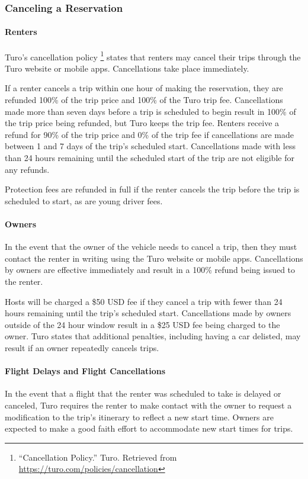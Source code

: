 \documentclass[review,12pt]{elsarticle}
\begin{document}
  \subsubsection{Canceling a Reservation}
    \paragraph{Renters}
    Turo's cancellation policy
    \footnote{``Cancellation Policy.'' Turo. Retrieved from \url{https://turo.com/policies/cancellation}
    }
    states that renters may cancel their trips through the Turo website or mobile apps. Cancellations take place immediately.

    If a renter cancels a trip within one hour of making the reservation, they are refunded 100\% of the trip price and 100\% of the Turo trip fee. Cancellations made more than seven days before a trip is scheduled to begin result in 100\% of the trip price being refunded, but Turo keeps the trip fee. Renters receive a refund for 90\% of the trip price and 0\% of the trip fee if cancellations are made between 1 and 7 days of the trip's scheduled start. Cancellations made with less than 24 hours remaining until the scheduled start of the trip are not eligible for any refunds.

    Protection fees are refunded in full if the renter cancels the trip before the trip is scheduled to start, as are young driver fees.

    \paragraph{Owners}
    In the event that the owner of the vehicle needs to cancel a trip, then they must contact the renter in writing using the Turo website or mobile apps. Cancellations by owners are effective immediately and result in a 100\% refund being issued to the renter.

    Hosts will be charged a \$50 USD fee if they cancel a trip with fewer than 24 hours remaining until the trip's scheduled start. Cancellations made by owners outside of the 24 hour window result in a \$25 USD fee being charged to the owner. Turo states that additional penalties, including having a car delisted, may result if an owner repeatedly cancels trips.

    \paragraph{Flight Delays and Flight Cancellations}
    In the event that a flight that the renter was scheduled to take is delayed or canceled, Turo requires the renter to make contact with the owner to request a modification to the trip's itinerary to reflect a new start time. Owners are expected to make a good faith effort to accommodate new start times for trips.
\end{document}
